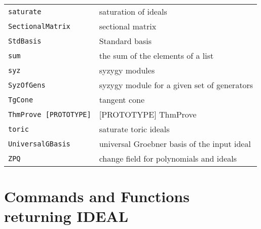 \documentclass[a4paper]{mybook}
\begin{document}
\begin{center}
\begin{longtable}{ll}
{\verb~saturate~} &
      saturation of ideals\\
   
{\verb~SectionalMatrix~} &
      sectional matrix \\
   
{\verb~StdBasis~} &
      Standard basis\\
   
{\verb~sum~} &
      the sum of the elements of a list\\
   
{\verb~syz~} &
      syzygy modules\\
   
{\verb~SyzOfGens~} &
      syzygy module for a given set of generators\\
   
{\verb~TgCone~} &
      tangent cone\\
   
{\verb~ThmProve [PROTOTYPE]~} &
      [PROTOTYPE] ThmProve\\
   
{\verb~toric~} &
      saturate toric ideals\\
   
{\verb~UniversalGBasis~} &
      universal Groebner basis of the input ideal\\
   
{\verb~ZPQ~} &
      change field for polynomials and ideals\\
   
\end{longtable}
\end{center}

\noindent



\section{Commands and Functions returning IDEAL}
\label{Commands and Functions returning IDEAL}

        
\end{document}
